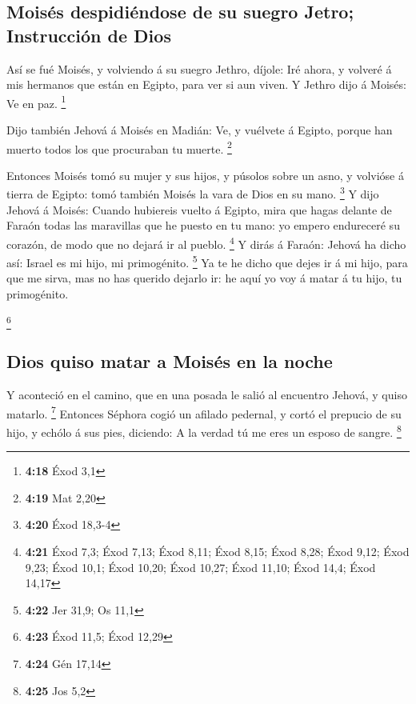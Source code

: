 \hypertarget{moisuxe9s-despidiuxe9ndose-de-su-suegro-jetro-instrucciuxf3n-de-dios}{%
\subsection{Moisés despidiéndose de su suegro Jetro; Instrucción de
Dios}\label{moisuxe9s-despidiuxe9ndose-de-su-suegro-jetro-instrucciuxf3n-de-dios}}

 Así se fué Moisés, y volviendo á su suegro Jethro,
díjole: Iré ahora, y volveré á mis hermanos que están en Egipto, para
ver si aun viven. Y Jethro dijo á Moisés: Ve en paz. \footnote{\textbf{4:18}
  Éxod 3,1}

 Dijo también Jehová á Moisés en Madián: Ve, y vuélvete á
Egipto, porque han muerto todos los que procuraban tu muerte.
\footnote{\textbf{4:19} Mat 2,20}

 Entonces Moisés tomó su mujer y sus hijos, y púsolos
sobre un asno, y volvióse á tierra de Egipto: tomó también Moisés la
vara de Dios en su mano. \footnote{\textbf{4:20} Éxod 18,3-4}
 Y dijo Jehová á Moisés: Cuando hubiereis vuelto á
Egipto, mira que hagas delante de Faraón todas las maravillas que he
puesto en tu mano: yo empero endureceré su corazón, de modo que no
dejará ir al pueblo. \footnote{\textbf{4:21} Éxod 7,3; Éxod 7,13; Éxod
  8,11; Éxod 8,15; Éxod 8,28; Éxod 9,12; Éxod 9,23; Éxod 10,1; Éxod
  10,20; Éxod 10,27; Éxod 11,10; Éxod 14,4; Éxod 14,17} 
Y dirás á Faraón: Jehová ha dicho así: Israel es mi hijo, mi
primogénito. \footnote{\textbf{4:22} Jer 31,9; Os 11,1} 
Ya te he dicho que dejes ir á mi hijo, para que me sirva, mas no has
querido dejarlo ir: he aquí yo voy á matar á tu hijo, tu primogénito.

\footnote{\textbf{4:23} Éxod 11,5; Éxod 12,29}

\hypertarget{dios-quiso-matar-a-moisuxe9s-en-la-noche}{%
\subsection{Dios quiso matar a Moisés en la
noche}\label{dios-quiso-matar-a-moisuxe9s-en-la-noche}}

 Y aconteció en el camino, que en una posada le salió al
encuentro Jehová, y quiso matarlo. \footnote{\textbf{4:24} Gén 17,14}
 Entonces Séphora cogió un afilado pedernal, y cortó el
prepucio de su hijo, y echólo á sus pies, diciendo: A la verdad tú me
eres un esposo de sangre. \footnote{\textbf{4:25} Jos 5,2}


